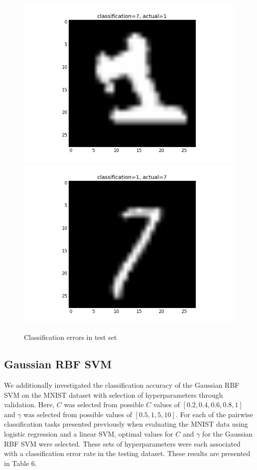 \documentclass{article}
\begin{document}
\begin{figure}[width=\linewidth]
\centering
\begin{multicols}{2}
  \includegraphics[width=1.2\linewidth]{code/P4/error,1.png}
  \includegraphics[width=1.2\linewidth]{code/P4/error,7.png}
\end{multicols}
\caption{Classification errors in test set}
\end{figure}

\subsection{Gaussian RBF SVM}

We additionally investigated the classification accuracy of the Gaussian RBF SVM on the MNIST dataset with selection of hyperparameters through validation. Here, $C$ was selected from possible $C$ values of $[0.2, 0.4, 0.6, 0.8, 1]$ and $\gamma$ was selected from possible values of $[0.5, 1, 5, 10]$. For each of the pairwise classification tasks presented previously when evaluating the MNIST data using logistic regression and a linear SVM, optimal values for $C$ and $\gamma$ for the Gaussian RBF SVM were selected. These sets of hyperparameters were each associated with a classification error rate in the testing dataset. These results are presented in Table 6.
\end{document}
